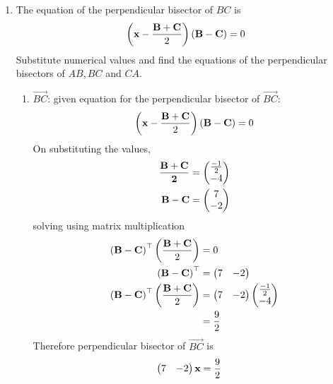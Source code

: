 \documentclass[11pt]{book}
\begin{document}
\begin{enumerate}[label=\thesection.\arabic*.,ref=\thesection.\theenumi]

\item The equation of the perpendicular bisector of $BC$ is
\begin{align}
\label{eq:tri-perp-bisect}
\brak{\vec{x}-\frac{\vec{B}+\vec{C}}{2}}\brak{\vec{B}-\vec{C}} = 0
\end{align}
Substitute numerical values and find the equations of the perpendicular bisectors of $AB, BC$ and $CA$.
\\	\solution
\begin{enumerate}
    \item $\vec{BC}$: given equation for the perpendicular bisector of $\vec{BC}$:
\begin{align}
    \left(\mathbf{x}-\frac{\mathbf{B}+\mathbf{C}}{2}\right)\left(\mathbf{B}-\mathbf{C}\right) = 0
\end{align}
On substituting the values,
\begin{align}
    \mathbf{\frac{\mathbf{B}+\mathbf{C}}{2}} &= \begin{pmatrix}\frac{-1}{2} \\ -4\end{pmatrix} \\
\mathbf{B}-\mathbf{C} &= \begin{pmatrix}7 \\ -2\end{pmatrix} \\
\end{align}
solving using matrix multiplication
\begin{align}
\left(\mathbf{B}-\mathbf{C}\right)^{\top}\left(\frac{\mathbf{B}+\mathbf{C}}{2}\right)&=0 \\
\left(\mathbf{B}-\mathbf{C}\right)^{\top} &= \begin{pmatrix}7 & -2\end{pmatrix} \\
\left(\mathbf{B}-\mathbf{C}\right)^{\top}\left(\frac{\mathbf{B}+\mathbf{C}}{2}\right)&=\begin{pmatrix}7 & -2\end{pmatrix}\begin{pmatrix}\frac{-1}{2} \\ -4\end{pmatrix}\\
&= \frac{9}{2}
\end{align}
Therefore perpendicular bisector of $\vec{BC}$ is
\begin{align}
    \begin{pmatrix}7 & -2\end{pmatrix}\mathbf{x}&= \frac{9}{2}
\end{align}


\end{enumerate}
\end{enumerate}
\end{document}
